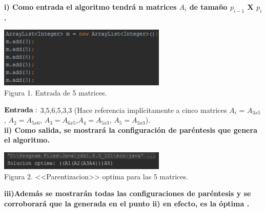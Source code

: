 \documentclass[spanish]{article}
\begin{document}
	{\large{ {\bf i) Como entrada el algoritmo tendrá n matrices $A_{i}$ de tamaño $p_{i-1}$ X $p_{i}$.}}}\\
	\begin{center}
		\includegraphics[width=0.60\textwidth]{./imagenes/1.png}\\
		Figura 1. Entrada de 5 matrices.\\
	\end{center}
	${\bf Entrada:}$ 3,5,6,5,3,3 (Hace referencia implícitamente a cinco matrices $A_{i}$ = $A_{3x5}$ , $A_{2}= A_{5x6}$, $A_{3}=A_{6x5}$,$A_{4}=A_{5x3}$, $A_{5}=A_{3x3}$).\\

{\large{\bf ii)  Como salida, se mostrará la configuración de paréntesis que genera el algoritmo.}}\\
	\begin{center}
		\includegraphics[width=0.60\textwidth]{./imagenes/2.png}\\
		Figura 2. <<Parentizacion>> optima para las 5 matrices.\\
	\end{center}
\newpage	
	{\large{\bf iii)Además se mostrarán todas las configuraciones de paréntesis y se corroborará que la generada en el punto ii) en efecto, es la óptima .}}\\
\end{document}
